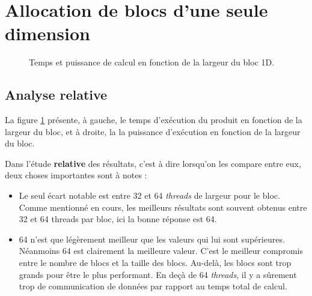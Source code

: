 \documentclass[	DIV=calc,%
							paper=a4,%
							fontsize=11pt%
							]{scrartcl}	 					%
\begin{document}
\section{Allocation de blocs d'une seule dimension}
\begin{figure}
    \hfill
    \caption{Temps et puissance de calcul en fonction de la largeur du bloc 1D.}
    \label{fig:1DK1}
\end{figure}

\subsection{Analyse relative}
La figure \ref{fig:1DK1} présente, à gauche, le temps d'exécution du produit en fonction de la largeur du bloc, et à droite, la la puissance d'exécution en fonction de la largeur du bloc.\par
Dans l'étude \textbf{relative} des résultats, c'est à dire lorsqu'on les compare entre eux, deux choses importantes sont à notes : 
\begin{itemize}
\item Le seul écart notable est entre 32 et 64 \textit{threads} de largeur pour le bloc. Comme mentionné en cours, les meilleurs résultats sont souvent obtenus entre 32 et 64 threads par bloc, ici la bonne réponse est 64.
\item 64 n'est que légèrement meilleur que les valeurs qui lui sont supérieures. Néanmoins 64 est clairement la meilleure valeur. C'est le meilleur compromis entre le nombre de blocs et la taille des blocs. Au-delà, les blocs sont trop grands pour être le plus performant. En deçà de 64 \textit{threads}, il y a sûrement trop de communication de données par rapport au temps total de calcul.
\end{itemize}
\end{document}
